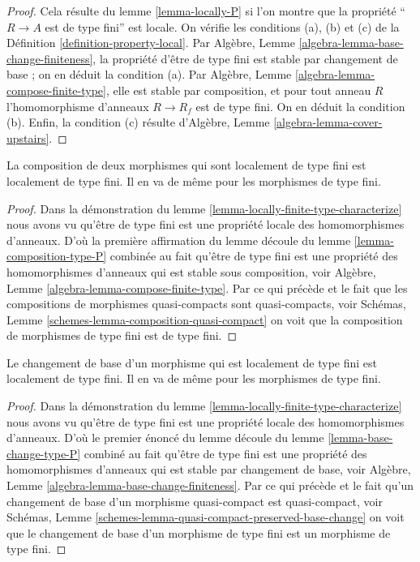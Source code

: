 \begin{proof}
Cela résulte du lemme \ref{lemma-locally-P} si l'on montre que la propriété
``$R \to A$ est de type fini''
est locale. On vérifie les conditions (a), (b)
et (c) de la Définition \ref{definition-property-local}.
Par Algèbre, Lemme \ref{algebra-lemma-base-change-finiteness}, la propriété d'être de type fini est
stable par changement de base ; on en déduit
la condition (a). Par Algèbre, Lemme
\ref{algebra-lemma-compose-finite-type}, elle est stable par composition,
et pour tout anneau $R$ l'homomorphisme
d'anneaux $R \to R_f$ est de type fini.
On en déduit la condition (b). Enfin, la
condition (c) résulte d'Algèbre, Lemme \ref{algebra-lemma-cover-upstairs}.
\end{proof}

\begin{lemma}
\label{lemma-composition-finite-type}
La composition de deux morphismes qui sont localement de type fini est localement
de type fini. Il en va de même pour les morphismes de type fini.
\end{lemma}

\begin{proof}
Dans la démonstration du lemme \ref{lemma-locally-finite-type-characterize} nous avons vu qu'être
de type fini est une propriété locale des homomorphismes
d'anneaux. D'où la première affirmation du lemme
découle du lemme \ref{lemma-composition-type-P} combinée
au fait qu'être de type fini est une propriété des homomorphismes
d'anneaux qui est stable sous
composition, voir Algèbre, Lemme \ref{algebra-lemma-compose-finite-type}. Par
ce qui précède et le fait que les compositions
de morphismes quasi-compacts sont
quasi-compacts, voir Schémas, Lemme \ref{schemes-lemma-composition-quasi-compact} on voit
que la composition de morphismes de type fini est de
type fini.
\end{proof}

\begin{lemma}
\label{lemma-base-change-finite-type}
Le changement de base d'un morphisme qui est localement de type fini
est localement de type fini. Il en va de même pour les morphismes de
type fini.
\end{lemma}

\begin{proof}
Dans la démonstration du lemme \ref{lemma-locally-finite-type-characterize} nous avons vu qu'être
de type fini est une propriété locale des homomorphismes
d'anneaux. D'où le premier énoncé du lemme découle
du lemme \ref{lemma-base-change-type-P} combiné au fait
qu'être de type fini est une propriété des homomorphismes d'anneaux
qui est stable par changement
de base, voir Algèbre, Lemme \ref{algebra-lemma-base-change-finiteness}. Par
ce qui précède et le fait qu'un changement de
base d'un morphisme quasi-compact est
quasi-compact, voir Schémas, Lemme \ref{schemes-lemma-quasi-compact-preserved-base-change} on voit que le changement
de base d'un morphisme de type fini est un morphisme
de type fini.
\end{proof}

